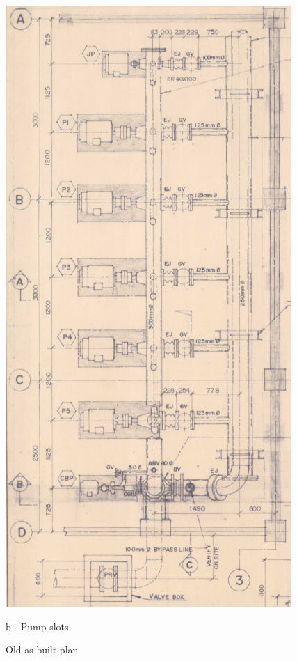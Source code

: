\begin{figure}[!htb]
\begin{minipage}[b]{0.3\linewidth}
		\includegraphics[width=\textwidth]{figures/fig_ch043_asbuilt_layout2}
		\caption*{b - Pump slots}
	\end{minipage}
	\caption{Old as-built plan}
	\label{fig_ch043_asbuilt_layout}
\end{figure}
%